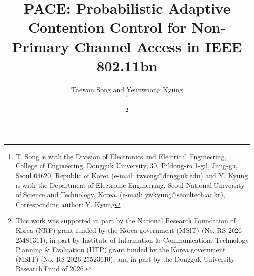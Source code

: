 \documentclass[conference]{IEEEtran}
\begin{document}
\title{PACE: Probabilistic Adaptive Contention Control for Non-Primary Channel Access in IEEE 802.11bn}

\author{Taewon Song and Yeunwoong Kyung

\thanks{T. Song is with the Division of Electronics and Electrical Engineering, College of Engineering, Dongguk University, 30, Pildong-ro 1-gil, Jung-gu, Seoul 04620, Republic of Korea (e-mail: twsong@dongguk.edu) and Y. Kyung is with the Department of Electronic Engineering, Seoul National University of Science and Technology,
Korea. (e-mail: ywkyung@seoultech.ac.kr), Corresponding author: Y. Kyung}%

\thanks{This work was supported in part by the National Research Foundation of Korea (NRF) grant funded by the Korea government (MSIT) (No. RS-2026-25481311), in part by Institute of Information \& Communications Technology Planning \& Evaluation (IITP) grant funded by the Korea government (MSIT) (No. RS-2026-25523610), and in part by the Dongguk University Research Fund of 2026.}
}

\maketitle
\end{document}

